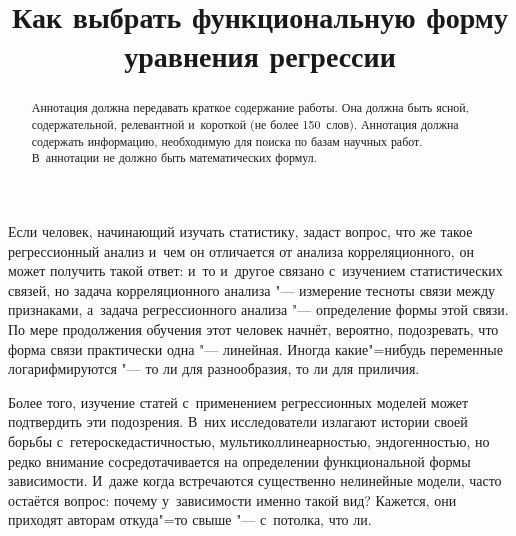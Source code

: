 \documentclass[final,pdftex]{../../template/epsilonj}
\begin{document}
\setcounter{page}{15}

	\begin{frontmatter}
		\title{Как выбрать функциональную форму уравнения регрессии}
		
		\begin{aug}
			\author{ }
			\address{Кафедра математической экономики и~эконометрики, НИУ ВШЭ, Москва.}
		\end{aug}
		
		\begin{abstract}
			Аннотация должна передавать краткое содержание работы.
			Она должна быть ясной, содержательной, релевантной и~короткой
			(не более 150~слов). Аннотация должна содержать информацию,
			необходимую для поиска по базам научных работ.
			В~аннотации не должно быть математических формул.
		\end{abstract}
		
		\begin{keyword}
		\end{keyword}
		
	\end{frontmatter}
	

Если человек, начинающий изучать статистику, задаст вопрос, что же такое регрессионный анализ и~чем он отличается от анализа корреляционного, он может получить такой ответ: и~то и~другое связано с~изучением статистических связей, но задача корреляционного анализа "--- измерение тесноты связи между признаками, а~задача регрессионного анализа "--- определение формы этой связи. По мере продолжения обучения этот человек начнёт, вероятно, подозревать, что форма связи практически одна "--- линейная. Иногда какие"=нибудь переменные логарифмируются "--- то ли для разнообразия, то ли для приличия.

Более того, изучение статей с~применением регрессионных моделей может подтвердить эти подозрения. В~них исследователи излагают истории своей борьбы с~гетероскедастичностью, мультиколлинеарностью, эндогенностью, но редко внимание сосредотачивается на определении функциональной формы зависимости. И~даже когда встречаются существенно нелинейные модели, часто остаётся вопрос: почему у~зависимости именно такой вид? Кажется, они приходят авторам откуда"=то свыше "--- с~потолка, что ли.
\end{document}
